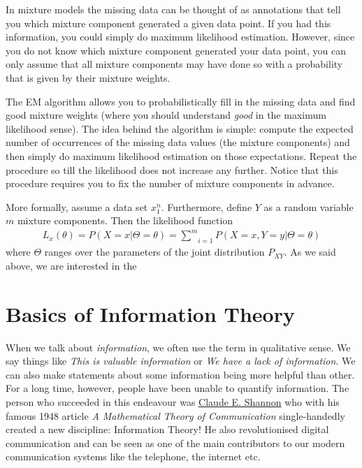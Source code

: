 In mixture models the missing data can be thought of as annotations that tell you which mixture component
generated a given data point. If you had this information, you could simply do maximum likelihood estimation.
However, since you do not know which mixture component generated your data point, you can only
assume that all mixture components may have done so with a probability that is given by their mixture
weights. 

The EM algorithm allows you to probabilistically fill in the missing data and find good mixture weights
(where you should understand \textit{good} in the maximum likelihood sense). The idea behind the
algorithm is simple: compute the expected number of occurrences of the missing data values (the mixture 
components) and then simply do maximum likelihood estimation on those expectations. Repeat the procedure 
so till the likelihood does not increase any further. Notice that this procedure requires you to
fix the number of mixture components in advance.

More formally, assume a data set $ x_{1}^{n} $. Furthermore, define $ Y $ as a random variable $ m $
mixture components. Then the likelihood function
\begin{align}
L_{x}(\theta) = P(X=x|\Theta=\theta) = \underset{i=1}{\overset{m}{\sum}} P(X=x, Y=y|\Theta=\theta)
\end{align}
where $ \Theta $ ranges over the parameters of the joint distribution $ P_{XY} $. As we said above,
we are interested in the 


\section{Basics of Information Theory}

When we talk about \textit{information}, we often use the term in qualitative sense. We say things like 
\textit{This is valuable information} or 
\textit{We have a lack of information}. We can also make statements about some information being more helpful than other. For a long time, however,
people have been unable to quantify information. The person who succeeded in this endeavour was \href{https://en.wikipedia.org/wiki/Claude_Shannon}{Claude E. Shannon}
who with his famous 1948 article \textit{A Mathematical Theory of Communication} single-handedly created a new discipline: Information Theory! He also revolutionised
digital communication and can be seen as one of the main contributors to our modern communication systems like the telephone, the internet etc. 

